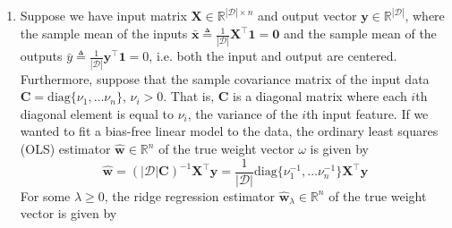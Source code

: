 \documentclass{article}
\numberwithin{equation}{section}
\begin{document}
\begin{enumerate}
    \item
    Suppose we have input matrix $ \mathbf{X} \in
    \mathbb{R}^{|\mathcal{D}| \times n} $ and output vector $ \mathbf{y} \in
    \mathbb{R}^{|\mathcal{D}|} $, where the sample mean of the inputs
    $ \bar{\mathbf{x}} \triangleq
    \frac{1}{|\mathcal{D}|}\mathbf{X}^\top\mathbf{1} = \mathbf{0} $ and the
    sample mean of the outputs $ \bar{y} \triangleq \frac{1}{|\mathcal{D}|}
    \mathbf{y}^\top\mathbf{1} = 0 $, i.e. both the input and output are
    centered. Furthermore, suppose that the sample covariance matrix of the
    input data $ \mathbf{C} = \mathrm{diag}\{\nu_1, \ldots \nu_n\} $,
    $ \nu_i > 0 $. That is, $ \mathbf{C} $ is a diagonal matrix where each
    $ i $th diagonal element is equal to $ \nu_i $, the variance of the $ i $th
    input feature. If we wanted to fit a bias-free\footnotemark{} linear model to the data, the ordinary least squares (OLS) estimator
    $ \hat{\mathbf{w}} \in \mathbb{R}^n $ of the true weight vector $ \omega $
    is given by
    \begin{equation*}
        \hat{\mathbf{w}} =
        (|\mathcal{D}|\mathbf{C})^{-1}\mathbf{X}^\top\mathbf{y} =
        \frac{1}{|\mathcal{D}|}\mathrm{diag}\{\nu_1^{-1}, \ldots \nu_n^{-1}\}
        \mathbf{X}^\top\mathbf{y}
    \end{equation*}
    For some $ \lambda \ge 0 $, the ridge regression estimator
    $ \hat{\mathbf{w}}_\lambda \in \mathbb{R}^n $ of the true weight vector is
    given by
    \begin{equation*}

\end{equation*}
\end{enumerate}
\end{document}
